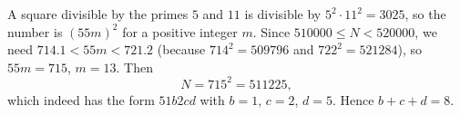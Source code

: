 A square divisible by the primes $5$ and $11$ is divisible by $5^2\cdot11^2=3025$, so the number is $(55m)^2$ for a positive integer $m$. Since $510000\le N<520000$, we need $714.1<55m<721.2$ (because $714^2=509796$ and $722^2=521284$), so $55m=715$, $m=13$. Then
\[
N=715^2=511225,
\]
which indeed has the form $51b2cd$ with $b=1$, $c=2$, $d=5$. Hence $b+c+d=\boxed{8}$.
